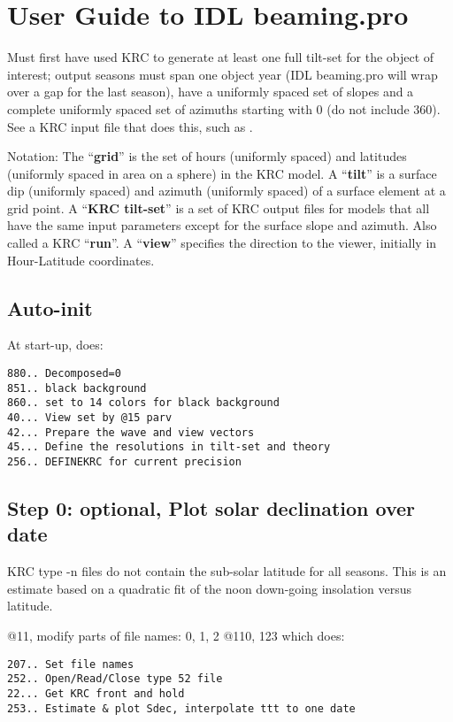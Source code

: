 \documentclass{article}
\begin{document}
\section{User Guide to IDL beaming.pro}
Must first have used KRC to generate at least one full tilt-set for the object
of interest; output seasons must span one object year (IDL beaming.pro will wrap
over a gap for the last season), have a uniformly spaced set of slopes and a
complete uniformly spaced set of azimuths starting with 0 (do not include
360). See a KRC input file that does this, such as  .

Notation:
\qi The ``\textbf{grid}''  is the set of hours (uniformly spaced) and latitudes (uniformly spaced in area on a sphere) in the KRC model.
\qi A ``\textbf{tilt}'' is a surface dip (uniformly spaced) and azimuth (uniformly spaced) of a surface element at a grid point.
\qi A ``\textbf{KRC tilt-set}'' is a set of KRC output files for models that all have the same input parameters except for the surface slope and azimuth. Also called a KRC  ``\textbf{run}''.
\qi A ``\textbf{view}'' specifies the direction to the viewer, initially in Hour-Latitude coordinates.

\subsection{Auto-init}
At start-up,  does:
\vspace{-3.mm} 
\begin{verbatim}
880.. Decomposed=0
851.. black background
860.. set to 14 colors for black background
40... View set by @15 parv
42... Prepare the wave and view vectors
45... Define the resolutions in tilt-set and theory 
256.. DEFINEKRC for current precision
\end{verbatim} 

\subsection{Step 0: optional, Plot solar declination over date}

KRC type -n files do not contain the sub-solar latitude for all seasons. 
This is an estimate based on a quadratic fit of the noon down-going insolation versus latitude.

@11, modify parts of file names: 0, 1, 2
\qi @110, 123 which does:
\vspace{-3.mm} 
\begin{verbatim}
207.. Set file names
252.. Open/Read/Close type 52 file
22... Get KRC front and hold
253.. Estimate & plot Sdec, interpolate ttt to one date
\end{verbatim}
\end{document}
